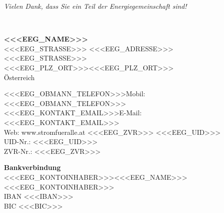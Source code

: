 \documentclass[a4paper,10pt]{article}
\def\eeguid{<<<EEG_UID>>>}
\def\eegstrasse{<<<EEG_STRASSE>>>}
\def\eegplzort{<<<EEG_PLZ_ORT>>>}
\def\eegzvr{<<<EEG_ZVR>>>}
\def\obmanntel{<<<EEG_OBMANN_TELEFON>>>}
\def\kontaktemail{<<<EEG_KONTAKT_EMAIL>>>}
\def\kontoinhaber{<<<EEG_KONTOINHABER>>>}
\begin{document}
\vspace{5mm}
{\color{teal}\itshape Vielen Dank, dass Sie ein Teil der Energiegemeinschaft sind!}

\vfill
\noindent{\color{rulegray}\rule{\textwidth}{0.6pt}}\\[2.5mm]
{\scriptsize\color{midgray}
\begin{minipage}[t]{0.33\textwidth}
  {\bfseries\color{navy}<<<EEG_NAME>>>}\\[0.5mm]
  \ifx\eegstrasse\empty
    <<<EEG_ADRESSE>>>\\
  \else
    \eegstrasse\\
    \ifx\eegplzort\empty\else\eegplzort\\\fi
  \fi
  Österreich
\end{minipage}%
\begin{minipage}[t]{0.33\textwidth}
  \centering
  \ifx\obmanntel\empty\else Mobil: \obmanntel\\\fi
  \ifx\kontaktemail\empty\else E-Mail: \kontaktemail\\\fi
  Web: www.stromfueralle.at%
  \ifx\eegzvr\empty
    \ifx\eeguid\empty\else\\UID-Nr.: \eeguid\fi
  \else
    \\ZVR-Nr.: \eegzvr
  \fi
\end{minipage}%
\begin{minipage}[t]{0.34\textwidth}
  \raggedleft
  {\bfseries\color{navy}Bankverbindung}\\[0.5mm]
  \ifx\kontoinhaber\empty{}<<<EEG_NAME>>>\else\kontoinhaber\fi\\
  IBAN <<<IBAN>>>\\
  BIC <<<BIC>>>
\end{minipage}}
\end{document}
